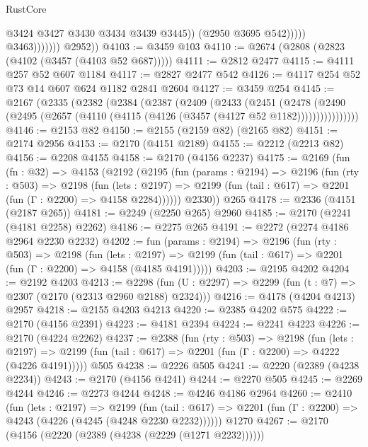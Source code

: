 \begin{lexlean}{RustCore}
\begin{coremodule}
                                  @3424
                                  @3427
                                  @3430
                                  @3434
                                  @3439
                                  @3445))
                              (@2950 @3695 @542)))))
                      @3463)))))))
        @2952))
@4103 := @3459 @103
@4110 := @2674 (@2808 (@2823 (@4102 (@3457 (@4103 @52 @687)))))
@4111 := @2812 @2477
@4115 := @4111 @257 @52 @607 @1184
@4117 := @2827 @2477 @542
@4126 := @4117 @254 @52 @73 @14 @607 @624 @1182 @2841 @2604
@4127 := @3459 @254
@4145 := @2167
    (@2335
      (@2382
        (@2384
          (@2387
            (@2409
              (@2433
                (@2451
                  (@2478
                    (@2490
                      (@2495 (@2657 (@4110 (@4115 (@4126 (@3457 (@4127 @52 @1182))))))))))))))))
@4146 := @2153 @82
@4150 := @2155 (@2159 @82) (@2165 @82)
@4151 := @2174 @2956
@4153 := @2170 (@4151 @2189)
@4155 := @2212 (@2213 @82)
@4156 := @2208 @4155
@4158 := @2170 (@4156 @2237)
@4175 := @2169
    (fun (fn : @32) =>
    @4153
      (@2192
        (@2195
          (fun (params : @2194) =>
          @2196
            (fun (rty : @503) =>
            @2198
              (fun (lets : @2197) =>
              @2199 (fun (tail : @617) => @2201 (fun (Γ : @2200) => @4158 @2284))))))
        @2330))
    @265
@4178 := @2336 (@4151 (@2187 @265))
@4181 := @2249 (@2250 @265) @2960
@4185 := @2170 (@2241 (@4181 @2258) @2262)
@4186 := @2275 @265
@4191 := @2272 (@2274 @4186 @2964 @2230 @2232)
@4202 := fun (params : @2194) =>
  @2196
    (fun (rty : @503) =>
    @2198
      (fun (lets : @2197) =>
      @2199 (fun (tail : @617) => @2201 (fun (Γ : @2200) => @4158 (@4185 @4191)))))
@4203 := @2195 @4202
@4204 := @2192 @4203
@4213 := @2298 (fun (U : @2297) => @2299 (fun (t : @7) => @2307 (@2170 (@2313 @2960 @2188) @2324)))
@4216 := @4178 (@4204 @4213) @2957
@4218 := @2155 @4203 @4213
@4220 := @2385 @4202 @575
@4222 := @2170 (@4156 @2391)
@4223 := @4181 @2394
@4224 := @2241 @4223
@4226 := @2170 (@4224 @2262)
@4237 := @2388
    (fun (rty : @503) =>
    @2198
      (fun (lets : @2197) =>
      @2199 (fun (tail : @617) => @2201 (fun (Γ : @2200) => @4222 (@4226 @4191)))))
    @505
@4238 := @2226 @505
@4241 := @2220 (@2389 (@4238 @2234))
@4243 := @2170 (@4156 @4241)
@4244 := @2270 @505
@4245 := @2269 @4244
@4246 := @2273 @4244
@4248 := @4246 @4186 @2964
@4260 := @2410
    (fun (lets : @2197) =>
    @2199
      (fun (tail : @617) => @2201 (fun (Γ : @2200) => @4243 (@4226 (@4245 (@4248 @2230 @2232))))))
    @1270
@4267 := @2170 (@4156 (@2220 (@2389 (@4238 (@2229 (@1271 @2232))))))

\end{coremodule}
\end{lexlean}
